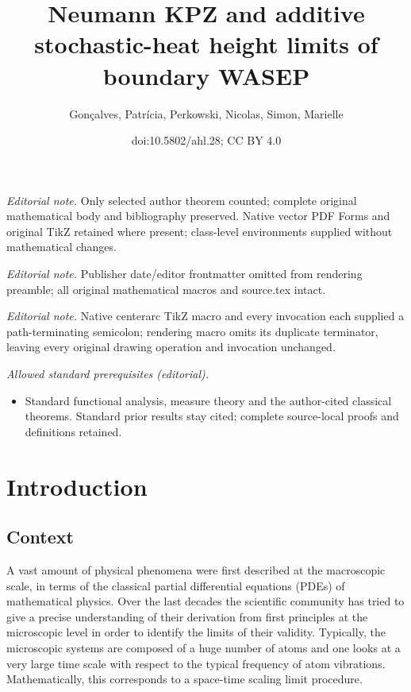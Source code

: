 \documentclass[10pt]{amsart}
\title{Neumann KPZ and additive stochastic-heat height limits of boundary WASEP}
\author{Gonçalves, Patrícia, Perkowski, Nicolas, Simon, Marielle}
\date{doi:10.5802/ahl.28; CC BY 4.0}
\theoremstyle{definition}\newtheorem{defi}[theo]{Definition}\newtheorem{rema}[theo]{Remark}\newtheorem{exam}[theo]{Example}\newtheorem{exem}[theo]{Example}\newtheorem{nota}[theo]{Notation}
\begin{document}
\maketitle
\noindent\textit{Editorial note.} Only selected author theorem counted; complete original mathematical body and bibliography preserved. Native vector PDF Forms and original TikZ retained where present; class-level environments supplied without mathematical changes.\par\medskip
\noindent\textit{Editorial note.} Publisher date/editor frontmatter omitted from rendering preamble; all original mathematical macros and source.tex intact.\par\medskip
\noindent\textit{Editorial note.} Native centerarc TikZ macro and every invocation each supplied a path-terminating semicolon; rendering macro omits its duplicate terminator, leaving every original drawing operation and invocation unchanged.\par\medskip
\noindent\textit{Allowed standard prerequisites (editorial).}\begin{itemize}
\item Standard functional analysis, measure theory and the author-cited classical theorems. Standard prior results stay cited; complete source-local proofs and definitions retained.
\end{itemize}\medskip

\section{Introduction}\label{s1}

\subsection{Context} A vast amount of physical phenomena were first described at the macroscopic scale, in terms of the classical partial differential equations (PDEs) of mathematical physics. Over the last decades the scientific community has tried to give a precise understanding of their derivation from first principles at the microscopic level in order to identify the limits of their validity. Typically, the microscopic systems are composed of a huge number of atoms and one looks at a very large time scale with respect to the typical frequency of atom vibrations. Mathematically, this corresponds to a space-time scaling limit procedure.
\end{document}
